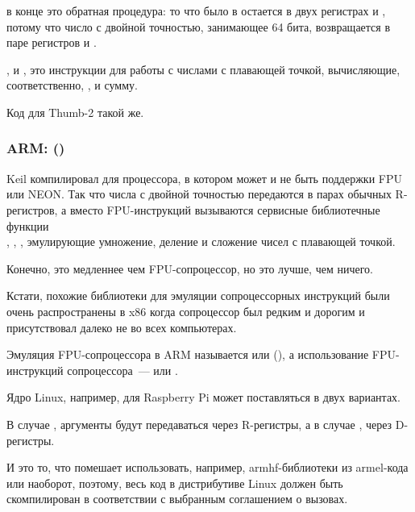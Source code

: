  в конце это обратная процедура: то что было в  
остается в двух регистрах  и , потому что число с двойной точностью, 
занимающее 64 бита, возвращается в паре регистров  и .

,  и , это инструкции для работы с числами 
с плавающей точкой, вычисляющие, соответственно, ,  и сумму.

Код для Thumb-2 такой же.

\subsubsection{ARM: \OptimizingKeilVI (\ThumbMode)}



Keil компилировал для процессора, в котором может и не быть поддержки FPU или NEON.
Так что числа с двойной точностью передаются в парах обычных R-регистров,
а вместо FPU-инструкций вызываются сервисные библиотечные функции\\
, , , эмулирующие умножение, деление и сложение чисел с плавающей точкой.

Конечно, это медленнее чем FPU-сопроцессор, но это лучше, чем ничего.

Кстати, похожие библиотеки для эмуляции сопроцессорных инструкций были очень распространены в x86 
когда сопроцессор был редким и дорогим и присутствовал далеко не во всех компьютерах.

Эмуляция FPU-сопроцессора в ARM называется  или  (),
а использование FPU-инструкций сопроцессора~---  или .

\iffalse
Ядро Linux, например, для Raspberry Pi может поставляться в двух вариантах.

В случае , аргументы будут передаваться через R-регистры, 
а в случае , через D-регистры.


И это то, что помешает использовать, например, armhf-библиотеки
из armel-кода или наоборот, поэтому, весь код в дистрибутиве Linux должен быть скомпилирован
в соответствии с выбранным соглашением о вызовах.

